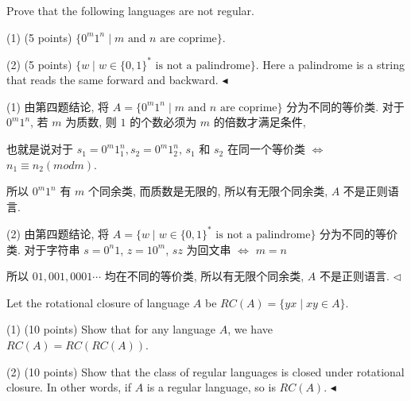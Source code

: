 \documentclass[11pt]{article}
\newenvironment{problem}[2][Problem]{\begin{trivlist}
		\item[\hskip \labelsep {\bfseries #1}\hskip \labelsep {\bfseries #2.}]}{\hfill$\blacktriangleleft$\end{trivlist}}
\newenvironment{answer}[1][Answer]{\begin{trivlist}
		\item[\hskip \labelsep {\bfseries #1.}\hskip \labelsep]}{\hfill$\lhd$\end{trivlist}}
\begin{document}
	\begin{problem}{5.(10 points)}
		Prove that the following languages are not regular.
		
		(1) (5 points) $\{0^m1^n\mid m \mbox{ and } n \mbox{ are coprime}\}$.
		
		(2) (5 points) $\{w\mid w\in \{0, 1\}^*\mbox{ is not a palindrome}\}$. Here a palindrome is a string that reads the same forward and backward.
	\end{problem}
	\begin{answer}
		(1) 由第四题结论, 将 $A=\{0^m1^n\mid m \mbox{ and } n \mbox{ are coprime}\}$ 分为不同的等价类. 对于 $0^m1^n$, 若 $m$ 为质数, 则 $1$ 的个数必须为 $m$ 的倍数才满足条件, 
		
		也就是说对于 $s_1=0^m1^n_1,s_2=0^m1^n_2$, $s_1$ 和 $s_2$ 在同一个等价类 $\Leftrightarrow$ $n_1\equiv n_2(mod m)$.
		
		所以 $0^m1^n$ 有 $m$ 个同余类, 而质数是无限的, 所以有无限个同余类, $A$ 不是正则语言.
		
		(2) 由第四题结论, 将 $A=\{w\mid w\in \{0, 1\}^*\mbox{ is not a palindrome}\}$ 分为不同的等价类. 对于字符串 $s=0^n1$, $z=10^m$, $sz$ 为回文串 $\Leftrightarrow$ $m=n$

        所以 $01,001,0001\cdots$ 均在不同的等价类, 所以有无限个同余类, $A$ 不是正则语言.
	\end{answer}
	\begin{problem}{6.(20 points)}
		Let the rotational closure of language $A$ be $RC(A) = \{yx\mid xy \in A\}$.
		
		(1) (10 points) Show that for any language $A$, we have $RC(A) = RC(RC(A))$.
		
		(2) (10 points) Show that the class of regular languages is closed under rotational closure. In other words, if $A$ is a regular language, so is $RC(A)$.
	\end{problem}
\end{document}

